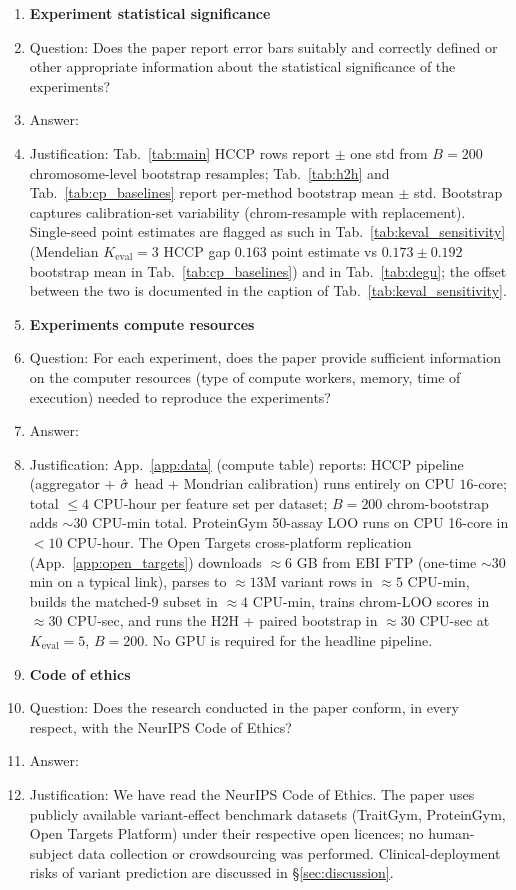 \begin{enumerate}
\item {\bf Experiment statistical significance}
    \item[] Question: Does the paper report error bars suitably and correctly defined or other appropriate information about the statistical significance of the experiments?
    \item[] Answer: \answerYes{}
    \item[] Justification: Tab.~\ref{tab:main} HCCP rows report $\pm$ one std from $B = 200$ chromosome-level bootstrap resamples; Tab.~\ref{tab:h2h} and Tab.~\ref{tab:cp_baselines} report per-method bootstrap mean $\pm$ std. Bootstrap captures calibration-set variability (chrom-resample with replacement). Single-seed point estimates are flagged as such in Tab.~\ref{tab:keval_sensitivity} (Mendelian $K_{\mathrm{eval}}=3$ HCCP gap $0.163$ point estimate vs $0.173 \pm 0.192$ bootstrap mean in Tab.~\ref{tab:cp_baselines}) and in Tab.~\ref{tab:degu}; the offset between the two is documented in the caption of Tab.~\ref{tab:keval_sensitivity}.

\item {\bf Experiments compute resources}
    \item[] Question: For each experiment, does the paper provide sufficient information on the computer resources (type of compute workers, memory, time of execution) needed to reproduce the experiments?
    \item[] Answer: \answerYes{}
    \item[] Justification: App.~\ref{app:data} (compute table) reports: HCCP pipeline (aggregator + $\hat{\sigma}$ head + Mondrian calibration) runs entirely on CPU $16$-core; total $\leq 4$ CPU-hour per feature set per dataset; $B = 200$ chrom-bootstrap adds $\sim 30$ CPU-min total. ProteinGym 50-assay LOO runs on CPU 16-core in $< 10$ CPU-hour. The Open Targets cross-platform replication (App.~\ref{app:open_targets}) downloads $\approx 6$ GB from EBI FTP (one-time $\sim 30$ min on a typical link), parses to $\approx 13$M variant rows in $\approx 5$ CPU-min, builds the matched-9 subset in $\approx 4$ CPU-min, trains chrom-LOO scores in $\approx 30$ CPU-sec, and runs the H2H + paired bootstrap in $\approx 30$ CPU-sec at $K_{\mathrm{eval}} = 5$, $B = 200$. No GPU is required for the headline pipeline.

\item {\bf Code of ethics}
    \item[] Question: Does the research conducted in the paper conform, in every respect, with the NeurIPS Code of Ethics?
    \item[] Answer: \answerYes{}
    \item[] Justification: We have read the NeurIPS Code of Ethics. The paper uses publicly available variant-effect benchmark datasets (TraitGym, ProteinGym, Open Targets Platform) under their respective open licences; no human-subject data collection or crowdsourcing was performed. Clinical-deployment risks of variant prediction are discussed in §\ref{sec:discussion}.


\end{enumerate}

